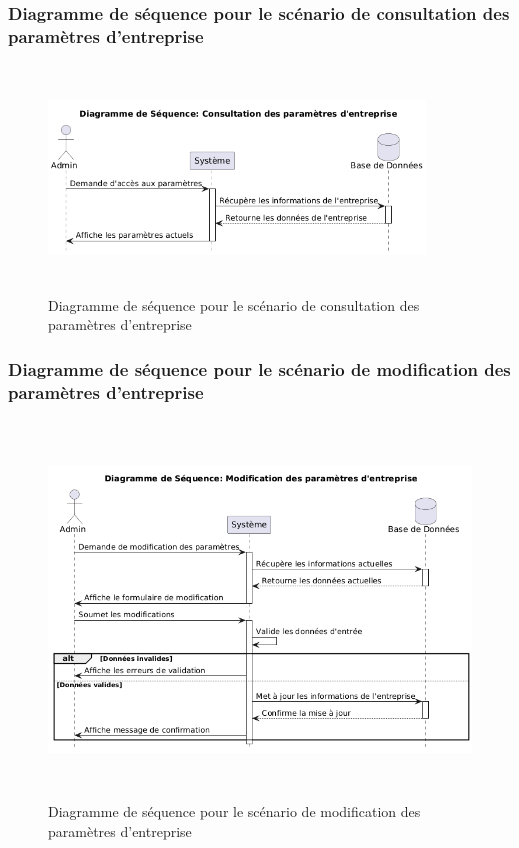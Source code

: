 \subsubsection{Diagramme de séquence pour le scénario de consultation des paramètres d'entreprise}
\begin{figure}[H]
    \centering
    \includegraphics[width=10cm,height=6cm]{images/consultparamcompanysq.png}
    \caption{Diagramme de séquence pour le scénario de consultation des paramètres d'entreprise}
\end{figure}

\subsubsection{Diagramme de séquence pour le scénario de modification des paramètres d'entreprise}
\begin{figure}[H]
    \centering
    \includegraphics[width=12cm,height=10cm]{images/modifyparamcompanysq.png}
    \caption{Diagramme de séquence pour le scénario de modification des paramètres d'entreprise}
\end{figure}

